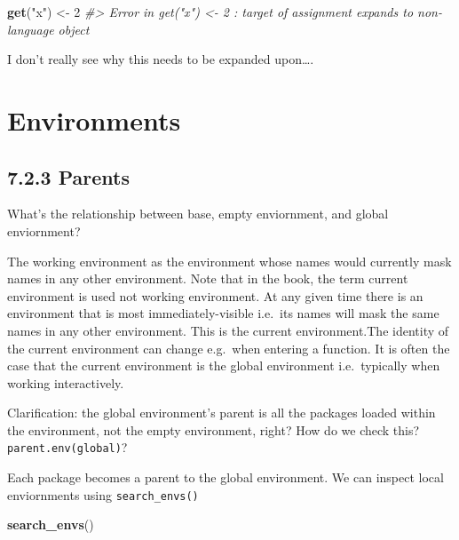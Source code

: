 \documentclass[]{book}
\newenvironment{Shaded}{\begin{snugshade}}{\end{snugshade}}
\newcommand{\CommentTok}[1]{\textcolor[rgb]{0.56,0.35,0.01}{\textit{#1}}}
\newcommand{\DecValTok}[1]{\textcolor[rgb]{0.00,0.00,0.81}{#1}}
\newcommand{\KeywordTok}[1]{\textcolor[rgb]{0.13,0.29,0.53}{\textbf{#1}}}
\newcommand{\NormalTok}[1]{#1}
\newcommand{\StringTok}[1]{\textcolor[rgb]{0.31,0.60,0.02}{#1}}
\begin{document}
\begin{Shaded}
\begin{Highlighting}[]
\KeywordTok{get}\NormalTok{(}\StringTok{"x"}\NormalTok{) <-}\StringTok{ }\DecValTok{2}
\CommentTok{#> Error in get("x") <- 2 : target of assignment expands to non-language object}
\end{Highlighting}
\end{Shaded}

I don't really see why this needs to be expanded upon\ldots{}.

\hypertarget{environments}{%
\chapter{Environments}\label{environments}}

\hypertarget{parents}{%
\section*{7.2.3 Parents}\label{parents}}

What's the relationship between base, empty enviornment, and global enviornment?

The working environment as the environment whose names would currently mask names in any other environment. Note that in the book, the term current environment is used not working environment. At any given time there is an environment that is most immediately-visible i.e.~its names will mask the same names in any other environment. This is the current environment.The identity of the current environment can change e.g.~when entering a function. It is often the case that the current environment is the global environment i.e.~typically when working interactively.

Clarification: the global environment's parent is all the packages loaded within the environment, not the empty environment, right? How do we check this? \texttt{parent.env(global)}?

Each package becomes a parent to the global environment. We can inspect local enviornments using \texttt{search\_envs()}

\begin{Shaded}
\begin{Highlighting}[]
\KeywordTok{search_envs}\NormalTok{()}
\end{Highlighting}
\end{Shaded}
\end{document}
